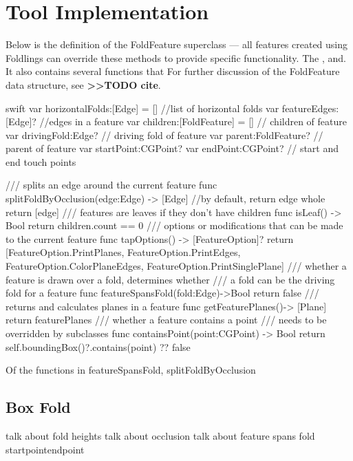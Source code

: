 \section{Tool Implementation}\label{tool-implementation}

Below is the definition of the FoldFeature superclass --- all features
created using Foldlings can override these methods to provide specific
functionality. The , and. It also contains several functions that For
further discussion of the FoldFeature data structure, see
\textbf{\textgreater{}\textgreater{}TODO cite}.

\small
\singlespacing 

\begin{pygmented}{swift}
var horizontalFolds:[Edge] = [] //list of horizontal folds
var featureEdges:[Edge]?        //edges in a feature
var children:[FoldFeature] = [] // children of feature
var drivingFold:Edge? // driving fold of feature
var parent:FoldFeature? // parent of feature
var startPoint:CGPoint?
var endPoint:CGPoint? // start and end touch points

/// splits an edge around the current feature
func splitFoldByOcclusion(edge:Edge) -> [Edge]
{
//by default, return edge whole
return [edge]
}
/// features are leaves if they don't have children
func isLeaf() -> Bool
{
return children.count == 0
}
/// options or modifications that can be made to the current feature
func tapOptions() -> [FeatureOption]?
{
  return [FeatureOption.PrintPlanes, FeatureOption.PrintEdges,
  FeatureOption.ColorPlaneEdges, FeatureOption.PrintSinglePlane]
}
/// whether a feature is drawn over a fold, determines whether 
/// a fold can be the driving fold for a feature
  func featureSpansFold(fold:Edge)->Bool
{
  return false
}
/// returns and calculates planes in a feature
func getFeaturePlanes()-> [Plane]{
  return featurePlanes
}
/// whether a feature contains a point
/// needs to be overridden by subclasses
func containsPoint(point:CGPoint) -> Bool{
  return self.boundingBox()?.contains(point) ?? false
}
\end{pygmented}

\doublespacing
\normalsize

Of the functions in featureSpansFold, splitFoldByOcclusion

\subsection{Box Fold}\label{box-fold}

talk about fold heights talk about occlusion talk about feature spans
fold startpointendpoint

